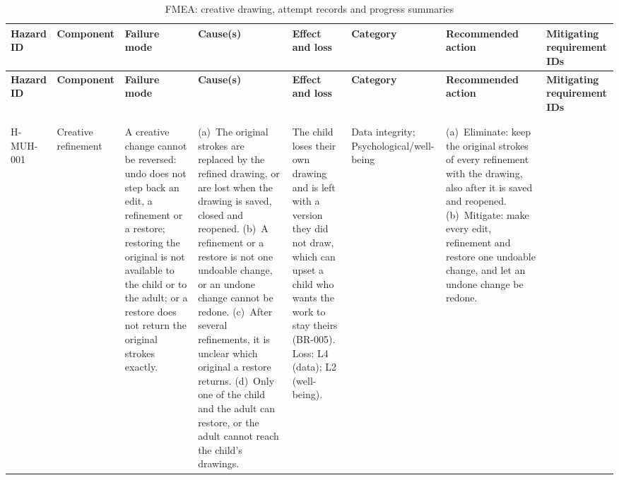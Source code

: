 \documentclass{article}
\newenvironment{fmealandscape}{
    \begin{landscape}
    \pagestyle{empty}
    \AddToShipoutPictureFG{ \AtPageLowerLeft{
        \put(\LenToUnit{\dimexpr\paperwidth-1.5cm\relax},
        \LenToUnit{.5\paperheight}){ \makebox(0,0)[c]{\rotatebox{90}{\thepage}}
        } } } }{
    \end{landscape}
    \ClearShipoutPictureFG }
\begin{document}
\begin{fmealandscape}
{\scriptsize
\setlength{\tabcolsep}{3pt}
\begin{longtable}{@{}
  >{\raggedright\arraybackslash}p{1.6cm} >{\raggedright\arraybackslash}p{1.75cm}
  >{\raggedright\arraybackslash}p{2.6cm} >{\raggedright\arraybackslash}p{2.25cm}
  >{\raggedright\arraybackslash}p{2.1cm} >{\raggedright\arraybackslash}p{1.5cm}
  >{\raggedright\arraybackslash}p{2.9cm}
  >{\raggedright\arraybackslash}p{2.3cm}@{}}
\caption{FMEA: creative drawing, attempt records and progress summaries}
\label{tab:fmea-muh}\\
\toprule
\textbf{Hazard ID} & \textbf{Component} & \textbf{Failure mode} &
\textbf{Cause(s)} & \textbf{Effect and loss} & \textbf{Category} &
\textbf{Recommended action} & \textbf{Mitigating requirement IDs} \\
\midrule
\endfirsthead
\toprule
\textbf{Hazard ID} & \textbf{Component} & \textbf{Failure mode} &
\textbf{Cause(s)} & \textbf{Effect and loss} & \textbf{Category} &
\textbf{Recommended action} & \textbf{Mitigating requirement IDs} \\
\midrule
\endhead
\midrule
\multicolumn{8}{@{}r@{}}{\emph{Continued on the next page}} \\
\endfoot
\bottomrule
\endlastfoot
%
\multicolumn{8}{@{}l}{\textbf{C4 Creative refinement}}
\\*
\addlinespace
H-MUH-001 & Creative refinement & A creative change
cannot be reversed: undo does not step back an edit, a refinement or a restore;
restoring the original is not available to the child or to the adult; or a
restore does not return the original strokes exactly. & (a)~The original strokes
are replaced by the refined drawing, or are lost when the drawing is saved,
closed and reopened. (b)~A refinement or a restore is not one undoable change,
or an undone change cannot be redone. (c)~After several refinements, it is
unclear which original a restore returns. (d)~Only one of the child and the
adult can restore, or the adult cannot reach the child's drawings. & The child
loses their own drawing and is left with a version they did not draw, which can
upset a child who wants the work to stay theirs (BR-005). Loss: L4 (data); L2
(well-being). & Data integrity; Psycho\-logical/\allowbreak{}well-being &
(a)~Eliminate: keep the original strokes of every refinement with the drawing,
also after it is saved and reopened. (b)~Mitigate: make every edit, refinement
and restore one undoable change, and let an undone change be redone.

\end{longtable}}
\end{fmealandscape}
\end{document}
